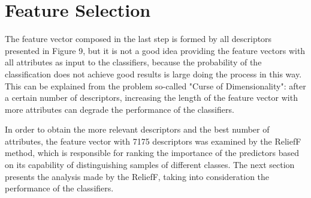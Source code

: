 \documentclass[conference]{IEEEtran}
\begin{document}
\section{Feature Selection}
The feature vector composed in the last step is formed by all descriptors presented in Figure 9, but it is not a good idea providing the feature vectors with all attributes as input to the classifiers, because the probability of the classification does not achieve good results is large doing the process in this way. This can be explained from the problem so-called "Curse of Dimensionality": after a certain number of descriptors, increasing the length of the feature vector with more attributes can degrade the performance of the classifiers.\par
In order to obtain the more relevant descriptors and the best number of attributes, the feature vector with 7175 descriptors was examined by the ReliefF method, which is responsible for ranking the importance of the predictors based on its capability of distinguishing samples of different classes. The next section presents the analysis made by the ReliefF, taking into consideration the performance of the classifiers.
\end{document}
